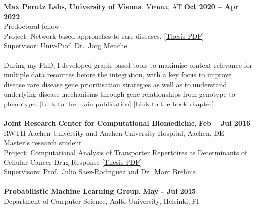 \documentclass[margin,line]{resume}
\begin{document}
\begin{resume}
    \textbf{Max Perutz Labs, University of Vienna}, Vienna, AT \hfill \textbf{Oct 2020 -- Apr 2022} \vspace{1mm}\\ 
    Predoctoral  fellow \\ 
    Project: Network-based approaches to rare diseases. \href{https://repositorium.meduniwien.ac.at/obvumwhs/download/pdf/7902393?originalFilename=true}{[Thesis PDF]}  \\Supervisor: Univ-Prof. Dr.~J{\"o}rg Menche \vspace{-2mm}\\ \\
During my PhD, I developed graph-based tools to maximise context relevance for multiple data resources before the integration, with a key focus to improve disease rare disease gene prioritisation strategies as well as to understand underlying disease mechanisms through gene relationships from genotype to phenotype. 
\href{https://menchelab.com/files/menchelab/publication_pdfs/PBuphamalai_MultiOme.pdf}{[Link to the main publication]} \href{https://menchelab.com/files/menchelab/publication_pdfs/bookChapter_Network_Medicine.pdf}{[Link to the book chapter]} \\ \vspace{1mm}\\
%
 \textbf{Joint Research Center for Computational Biomedicine}, \hfill \textbf{Feb -- Jul 2016}\\RWTH-Aachen University and Aachen University Hospital, Aachen, DE  \vspace{1mm}\\
 Master’s research student \\ Project: Computational Analysis of Transporter Repertoires as Determinants of Cellular Cancer Drug Response \href{https://aaltodoc.aalto.fi/bitstream/handle/123456789/22818/master_Buphamalai_Pisanu_2016.pdf?sequence=1&isAllowed=y}{[Thesis PDF]}\\%
 \hspace{2mm} Supervisors: Prof.~Julio Saez-Rodriguez and Dr.~Marc Brehme  \\ \vspace{1mm}\\%
 \textbf{Probabilistic Machine Learning Group}, \hfill \textbf{May - Jul 2015}\\Department of Computer Science, Aalto University, Helsinki, FI  \vspace{1mm}\\

\end{resume}
\end{document}
